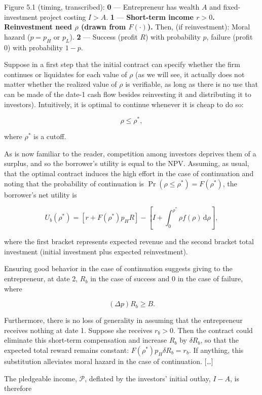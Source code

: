 \documentclass[11pt,a4paper]{article}
\begin{document}
Figure 5.1 (timing, transcribed): \textbf{0} --- Entrepreneur has wealth \(A\) and fixed-investment
project costing \(I > A\). \textbf{1} --- \textbf{Short-term income \(r > 0\). Reinvestment need
\(\rho\) (drawn from \(F(\cdot)\)).} Then, (if reinvestment): Moral hazard (\(p = p_H\) or \(p_L\)).
\textbf{2} --- Success (profit \(R\)) with probability \(p\), failure (profit 0) with probability
\(1 - p\).

Suppose in a first step that the initial contract can specify whether the firm continues or
liquidates for each value of \(\rho\) (as we will see, it actually does not matter whether the
realized value of \(\rho\) is verifiable, as long as there is no use that can be made of the date-1
cash flow besides reinvesting it and distributing it to investors). Intuitively, it is optimal to
continue whenever it is cheap to do so:

\[\rho \leqslant \rho^*,\]

where \(\rho^*\) is a cutoff.

As is now familiar to the reader, competition among investors deprives them of a surplus, and so the
borrower's utility is equal to the NPV. Assuming, as usual, that the optimal contract induces the
high effort in the case of continuation and noting that the probability of continuation is
\(\Pr(\rho \leqslant \rho^*) = F(\rho^*)\), the borrower's net utility is

\[U_b(\rho^*) = [r + F(\rho^*)p_HR] - \left[I + \int_0^{\rho^*}\rho f(\rho)\,\mathrm{d}\rho\right],\]

where the first bracket represents expected revenue and the second bracket total investment (initial
investment plus expected reinvestment).

Ensuring good behavior in the case of continuation suggests giving to the entrepreneur, at date 2,
\(R_b\) in the case of success and 0 in the case of failure, where

\[(\Delta p)R_b \geqslant B.\]

Furthermore, there is no loss of generality in assuming that the entrepreneur receives nothing at
date 1. Suppose she receives \(r_b > 0\). Then the contract could eliminate this short-term
compensation and increase \(R_b\) by \(\delta R_b\), so that the expected total reward remains
constant: \(F(\rho^*)p_H\delta R_b = r_b\). If anything, this substitution alleviates moral hazard
in the case of continuation. {[}\ldots{]}

The pledgeable income, \(\mathcal{P}\), deflated by the investors' initial outlay, \(I - A\), is
therefore
\end{document}
